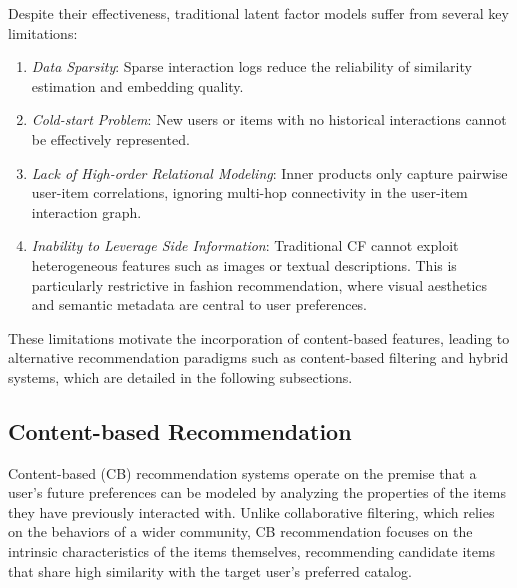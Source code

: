 Despite their effectiveness, traditional latent factor models suffer from several key limitations:
\begin{enumerate}
    \item \textit{Data Sparsity}: Sparse interaction logs reduce the reliability of similarity estimation and embedding quality.
    \item \textit{Cold-start Problem}: New users or items with no historical interactions cannot be effectively represented.
    \item \textit{Lack of High-order Relational Modeling}: Inner products only capture pairwise user-item correlations, ignoring multi-hop connectivity in the user-item interaction graph.
    \item \textit{Inability to Leverage Side Information}: Traditional CF cannot exploit heterogeneous features such as images or textual descriptions. This is particularly restrictive in fashion recommendation, where visual aesthetics and semantic metadata are central to user preferences.
\end{enumerate}
These limitations motivate the incorporation of content-based features, leading to alternative recommendation paradigms such as content-based filtering and hybrid systems, which are detailed in the following subsections.

\subsection{Content-based Recommendation}

Content-based (CB) recommendation systems operate on the premise that a user's future preferences can be modeled by analyzing the properties of the items they have previously interacted with. Unlike collaborative filtering, which relies on the behaviors of a wider community, CB recommendation focuses on the intrinsic characteristics of the items themselves, recommending candidate items that share high similarity with the target user's preferred catalog.

